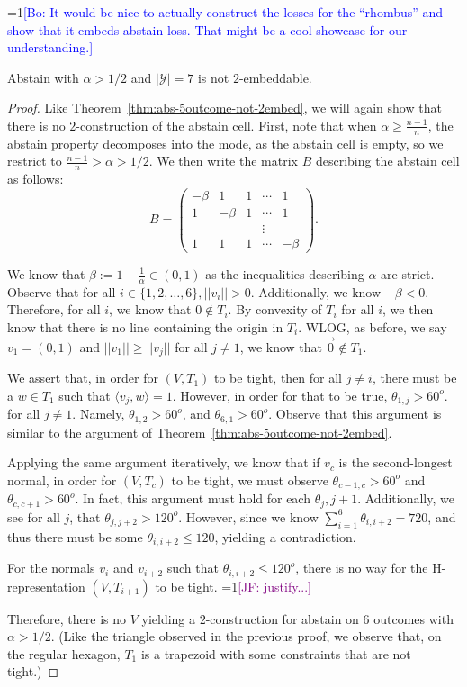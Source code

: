 \documentclass[anon,12pt]{colt2019}
\newcommand{\Comments}{1}
\newcommand{\mynote}[2]{\ifnum\Comments=1\textcolor{#1}{#2}\fi}
\newcommand{\jessie}[1]{\mynote{purple}{[JF: #1]}}
\newcommand{\bo}[1]{\mynote{blue}{[Bo: #1]}}
\newcommand{\Y}{\mathcal{Y}}
\newcommand{\inprod}[2]{\langle #1, #2 \rangle}%
\begin{document}
\bo{It would be nice to actually construct the losses for the ``rhombus'' and show that it embeds abstain loss. That might be a cool showcase for our understanding.}


\begin{theorem}
  Abstain with $\alpha > 1/2$ and $|\Y|=7$ is not $2$-embeddable.
\end{theorem}
\begin{proof}
  Like Theorem~\ref{thm:abs-5outcome-not-2embed}, we will again show that there is no $2$-construction of the abstain cell.  
  First, note that when $\alpha \geq \frac{n-1}{n}$, the abstain property decomposes into the mode, as the abstain cell is empty, so we restrict to $\frac{n-1}{n} > \alpha > 1/2$.
  We then write the matrix $B$ describing the abstain cell as follows:
	\[ B = \begin{pmatrix}
       -\beta &  1 &  1 & \cdots & 1  \\
       1  & -\beta &  1 & \cdots & 1  \\
          &    &    & \vdots &    \\
       1  &  1 &  1 & \cdots & -\beta
     \end{pmatrix} .
  \]
  
  We know that $\beta := 1 - \frac{1}{\alpha} \in (0,1)$ as the inequalities describing $\alpha$ are strict.
  Observe that for all $i \in \{1,2, \ldots, 6\}, ||v_i|| > 0$.
  Additionally, we know $-\beta < 0$.
  Therefore, for all $i$, we know that $0 \not \in T_i$.
  By convexity of $T_i$ for all $i$, we then know that there is no line containing the origin in $T_i$.
  WLOG, as before, we say $v_1 = (0,1)$ and $||v_1|| \geq ||v_j||$ for all $j \neq 1$, we know that $\vec{0} \not \in T_1$.
  
  We assert that, in order for $(V, T_1)$ to be tight, then for all $j \neq i$, there must be a $w \in T_1$ such that $\inprod{v_j}{w} = 1$.
  However, in order for that to be true, $\theta_{1,j} > 60^o$. for all $j \neq 1$.
  Namely, $\theta_{1,2} > 60^o$, and $\theta_{6,1} > 60^o$.
  Observe that this argument is similar to the argument of Theorem~\ref{thm:abs-5outcome-not-2embed}.
  
  Applying the same argument iteratively, we know that if $v_c$ is the second-longest normal, in order for $(V, T_c)$ to be tight, we must observe $\theta_{c-1, c} > 60^o$ and $\theta_{c,c+1} > 60^o$.
  In fact, this argument must hold for each $\theta_j, j+1$.
  Additionally, we see for all $j$, that $\theta_{j,j+2} > 120^o$.
  However, since we know $\sum_{i=1}^6 \theta_{i,i+2} = 720$, and thus there must be some $\theta_{i,i+2} \leq 120$, yielding a contradiction.
  
  For the normals $v_i$ and $v_{i+2}$ such that $\theta_{i,i+2} \leq 120^o$, there is no way for the H-representation $(V, T_{i+1})$ to be tight. \jessie{justify...}
  
  Therefore, there is no $V$ yielding a $2$-construction for abstain on $6$ outcomes with $\alpha > 1/2$.
  (Like the triangle observed in the previous proof, we observe that, on the regular hexagon, $T_1$ is a trapezoid with some constraints that are not tight.)
\end{proof}
\end{document}
